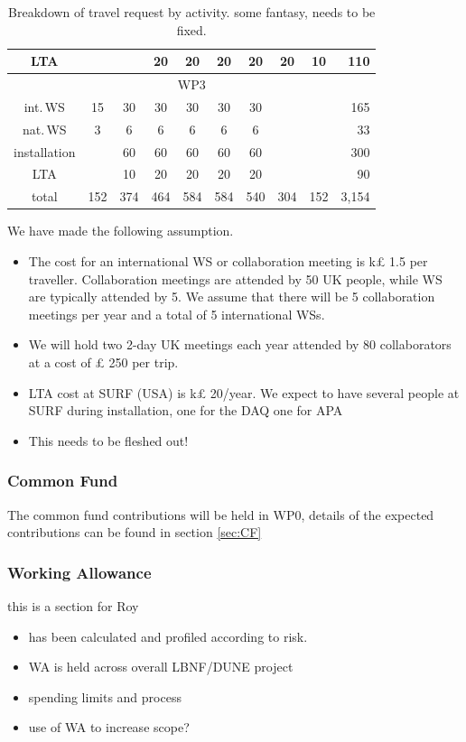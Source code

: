 \begin{table}[htb]
\begin{tabular}{|c||c|c|c|c|c|c|c|c||r|}
         LTA           &     &     & 20  & 20  & 20  &  20 & 20 & 10 & 110  \\
         \hline\hline
         \multicolumn{10}{|c|}{WP3 }\\
         \cline{1-10}
         int.\,WS      &  15 & 30  & 30  & 30  & 30  & 30  &    & & 165  \\
         nat.\,WS      &   3 &  6  &  6  & 6   &  6  &  6  &    & & 33  \\
         installation  &     & 60  & 60  & 60  & 60  &  60 &    & & 300  \\
         LTA           &     & 10  & 20  & 20  & 20  &  20 &    & & 90  \\
         \hline\hline
         total           & 152 & 374 & 464 & 584 & 584 & 540 & 304 & 152 & 3,154\\
         \hline
    \end{tabular}
    \caption{Breakdown of travel request by activity. \color{red} some fantasy, needs to be fixed.}
    \label{tab:travel}
\end{table}
We have made the following assumption.
\begin{itemize}
    \item The cost for an international WS or collaboration meeting is k£ 1.5 per traveller. Collaboration meetings are attended by 50 UK people, while WS are typically attended by 5.
    We assume that there will be 5 collaboration meetings per year and a total of 5 international WSs.
    \item We will hold two 2-day UK meetings each year attended by 80 collaborators at a cost of £ 250 per trip.
    \item
    LTA cost at SURF (USA) is k£ 20/year. We expect to have several people at SURF during installation, one for the DAQ one for APA
    \item {\color{red} This needs to be fleshed out!}
\end{itemize}

\subsubsection{Common Fund}
The common fund contributions will be held in WP0, details of the expected contributions can be found in section \ref{sec:CF}

\subsubsection{Working Allowance}

{\color{red}this is a section for Roy}

\begin{itemize}
    \item has been calculated and profiled according to risk.
    \item WA is held across overall LBNF/DUNE project
    \item spending limits and process
    \item use of WA to increase scope?
\end{itemize}

